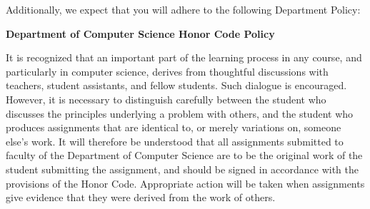 \documentclass[11pt]{article} %
\begin{document}
\noindent Additionally, we expect that you will adhere to the 
following Department Policy:

\begin{center} \textbf{ Department of Computer Science Honor Code Policy } \end{center}
\vspace*{-.1in}
It is recognized that an important part of the learning process in any course, and particularly in computer science, derives from thoughtful discussions with teachers, student
assistants, and fellow students. Such dialogue is encouraged. However, it is necessary
to distinguish carefully between the student who discusses the principles underlying a
problem with others, and the student who produces assignments that are identical to,
or merely variations on, someone else's work. It will therefore be understood that all
assignments submitted to faculty of the Department of Computer Science are to be
the original work of the student submitting the assignment, and should be signed in
accordance with the provisions of the Honor Code.  Appropriate action will be taken when assignments give evidence that they were derived from the work of others.
\end{document}
